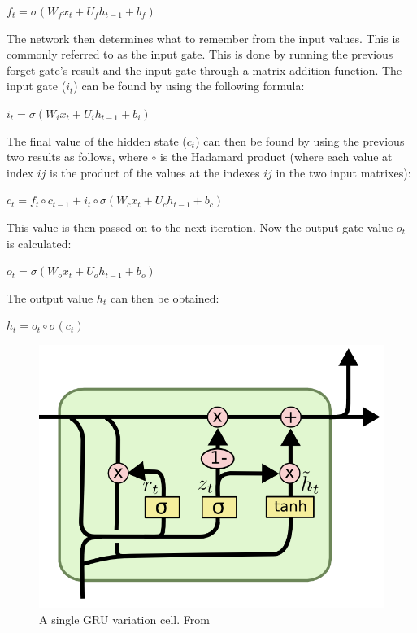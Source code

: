 \( f_t = \sigma(W_f x_t + U_f h_{t-1} + b_f) \)

The network then determines what to remember from the input values. This is commonly referred to as the input gate. This is done by running the previous forget gate's result and the input gate through a matrix addition function. The input gate (\(i_t\)) can be found by using the following formula:

\( i_t = \sigma(W_i x_t + U_i h_{t-1} + b_i) \)

The final value of the hidden state (\(c_t\)) can then be found by using the previous two results as follows, where \(\circ \) is the Hadamard product (where each value at index \(ij\) is the product of the values at the indexes \(ij\) in the two input matrixes): 

\( c_t = f_t \circ c_{t-1} + i_t \circ \sigma(W_c x_t + U_c h_{t-1} + b_c) \)

This value is then passed on to the next iteration. Now the output gate value \(o_t\) is calculated:

\( o_t = \sigma(W_o x_t + U_o h_{t-1} + b_o) \)

The output value \(h_t\) can then be obtained:

\( h_t = o_t \circ \sigma(c_t) \)

\begin{figure}
	\begin{center}
		\includegraphics[scale=0.5]{rnn/gru_cell}
	\end{center}
	\caption{A single GRU variation cell. From~\cite{GRU2015}\label{fig:gru_cell}}
\end{figure}


